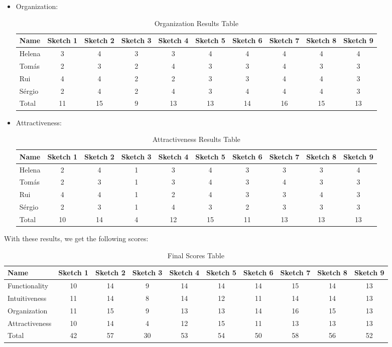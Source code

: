 \begin{itemize}
\begin{table}[H]
\begin{tabular}{l*{9}{c}}
\end{tabular}
\end{table}
\item Organization:
\begin{table}[H]
    \caption{Organization Results Table}
    \begin{tabular}{l*{9}{c}}
        Name & Sketch 1 & Sketch 2 & Sketch 3 & Sketch 4 
        & Sketch 5 & Sketch 6 & Sketch 7 & Sketch 8 & Sketch 9 \\
        \hline 
        Helena & 3 & 4 & 3 & 3 & 4 & 4 & 4 & 4 & 4 \\
        Tomás & 2 & 3 & 2 & 4 & 3 & 3 & 4 & 3 & 3 \\ 
        Rui & 4 & 4 & 2 & 2 & 3 & 3 & 4 & 4 & 3 \\ 
        Sérgio & 2 & 4 & 2 & 4 & 3 & 4 & 4 & 4 & 3 \\ 
        Total & 11 & 15 & 9 & 13 & 13 & 14 & 16 & 15 & 13 \\
    \end{tabular}
\end{table}
\item Attractiveness: 
\begin{table}[H]
    \caption{Attractiveness Results Table}
    \begin{tabular}{l*{9}{c}}
        Name & Sketch 1 & Sketch 2 & Sketch 3 & Sketch 4 
        & Sketch 5 & Sketch 6 & Sketch 7 & Sketch 8 & Sketch 9 \\
        \hline 
        Helena & 2 & 4 & 1 & 3 & 4 & 3 & 3 & 3 & 4 \\
        Tomás & 2 & 3 & 1 & 3 & 4 & 3 & 4 & 3 & 3 \\ 
        Rui & 4 & 4 & 1 & 2 & 4 & 3 & 3 & 4 & 3 \\ 
        Sérgio & 2 & 3 & 1 & 4 & 3 & 2 & 3 & 3 & 3 \\ 
        Total & 10 & 14 & 4 & 12 & 15 & 11 & 13 & 13 & 13 \\
    \end{tabular}
\end{table}
\end{itemize}
With these results, we get the following scores: 
\begin{table}[H]
    \caption{Final Scores Table}
    \begin{tabular}{l*{9}{c}}
        Name & Sketch 1 & Sketch 2 & Sketch 3 & Sketch 4 
        & Sketch 5 & Sketch 6 & Sketch 7 & Sketch 8 & Sketch 9 \\
        \hline 
        Functionality & 10 & 14 & 9 & 14 & 14 & 14 & 15 & 14 & 13 \\
        Intuitiveness & 11 & 14 & 8 & 14 & 12 & 11 & 14 & 14 & 13 \\ 
        Organization & 11 & 15 & 9 & 13 & 13 & 14 & 16 & 15 & 13 \\ 
        Attractiveness & 10 & 14 & 4 & 12 & 15 & 11 & 13 & 13 & 13 \\ 
        Total & 42 & 57 & 30 & 53 & 54 & 50 & 58 & 56 & 52 \\
    \end{tabular}
\end{table}
